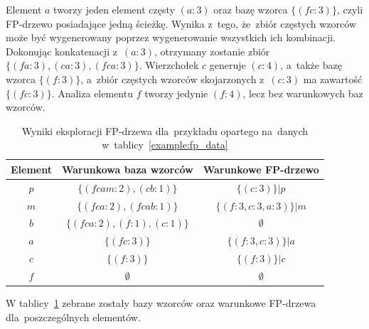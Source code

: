 Element $a$ tworzy jeden element częsty $(a:3)$ oraz bazę wzorca $\lbrace (fc:3) \rbrace$, czyli FP-drzewo posiadające jedną ścieżkę. Wynika z~tego, że~zbiór częstych wzorców może być wygenerowany poprzez wygenerowanie wszystkich ich kombinacji. Dokonując konkatenacji z~$(a:3)$, otrzymany zostanie zbiór $\lbrace (fa:3), (ca:3), (fca:3) \rbrace$. Wierzchołek $c$ generuje $(c:4)$, a~także bazę wzorca $\lbrace (f:3) \rbrace$, a~zbiór częstych wzorców skojarzonych z~$(c:3)$ ma zawartość $\lbrace (fc:3)\rbrace$. Analiza elementu $f$ tworzy jedynie $(f:4)$, lecz bez warunkowych baz wzorców.

\begin{table}
	\centering
	\begin{tabular}{c|c|c}
	\textbf{Element} &  \textbf{Warunkowa baza wzorców} & \textbf{Warunkowe FP-drzewo} \\ \hline
	$p$ & $\lbrace ( fcam: 2 ), (cb: 1) \rbrace$ & $\lbrace (c:3) \rbrace | p$ \\ 
	$m$ & $\lbrace ( fca: 2 ), (fcab: 1) \rbrace$ & $\lbrace (f:3, c:3, a:3) \rbrace | m$ \\ 
	$b$ & $\lbrace ( fca: 2 ), (f: 1), (c: 1) \rbrace$ & $\emptyset$ \\ 
	$a$ & $\lbrace ( fc: 3 ) \rbrace$ & $\lbrace (f:3, c:3) \rbrace | a$ \\ 
	$c$ & $\lbrace ( f: 3 ) \rbrace$ & $\lbrace (f:3) \rbrace | c$ \\ 
	$f$ & $\emptyset$ & $\emptyset$ \\ 
	\end{tabular}
	\caption{Wyniki eksploracji FP-drzewa dla~przykładu opartego na~danych w~tablicy~\ref{example:fp_data}\label{example:sum_patterns}}
\end{table}

W tablicy~\ref{example:sum_patterns} zebrane zostały bazy wzorców oraz warunkowe FP-drzewa dla~poszczególnych elementów.